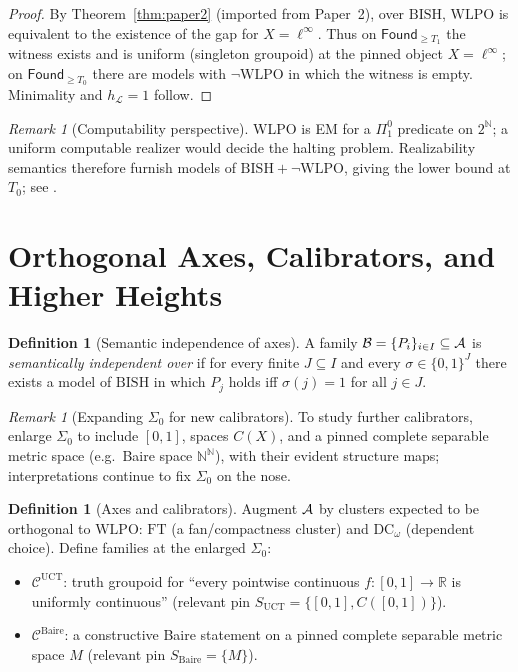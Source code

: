 \documentclass[11pt]{article}
\theoremstyle{definition}
\newtheorem{definition}[theorem]{Definition}
\theoremstyle{remark}
\newtheorem{remark}[theorem]{Remark}
\newcommand{\N}{\mathbb{N}}
\newcommand{\R}{\mathbb{R}}
\newcommand{\linf}{\ell^\infty}
\newcommand{\WLPO}{\mathrm{WLPO}}
\newcommand{\BISH}{\mathrm{BISH}}
\newcommand{\Found}{\mathsf{Found}}
\newcommand{\SigmaZero}{\Sigma_{0}}
\begin{document}
\begin{proof}
By Theorem~\ref{thm:paper2} (imported from Paper~2), over \(\BISH\),
\(\WLPO\) is equivalent to the existence of the gap for \(X=\linf\).
Thus on \(\Found_{\ge T_1}\) the witness exists and is uniform (singleton groupoid)
at the pinned object \(X=\linf\); on \(\Found_{\ge T_0}\) there are models with \(\neg\WLPO\) in which the witness is empty. Minimality and \(h_{\mathcal L}=1\) follow.
\end{proof}

\begin{remark}[Computability perspective]\label{p2:rem:computability}
WLPO is EM for a \(\Pi^0_1\) predicate on \(2^\N\); a uniform computable realizer would decide the halting problem. Realizability semantics therefore furnish models of \(\BISH+\neg\WLPO\), giving the lower bound at \(T_0\); see \cite{BridgesRichman,Ishihara06}.
\end{remark}

\section{Orthogonal Axes, Calibrators, and Higher Heights}\label{p2:sec:higher}

\begin{definition}[Semantic independence of axes]\label{p2:def:independence}
A family \(\mathcal{B}=\{P_i\}_{i\in I}\subseteq\mathcal{A}\) is \emph{semantically independent over \BISH} if for every finite \(J\subseteq I\) and every \(\sigma\in\{0,1\}^J\) there exists a model of \(\BISH\) in which \(P_j\) holds iff \(\sigma(j)=1\) for all \(j\in J\).
\end{definition}

\begin{remark}[Expanding \(\SigmaZero\) for new calibrators]\label{p2:rem:expand-sigma0}
To study further calibrators, enlarge \(\SigmaZero\) to include \([0,1]\),
spaces \(C(X)\), and a pinned complete separable metric space (e.g.\ Baire space \(\N^\N\)),
with their evident structure maps; interpretations continue to fix \(\SigmaZero\) on the nose.
\end{remark}

\begin{definition}[Axes and calibrators]\label{p2:def:axes-calibrators}
Augment \(\mathcal{A}\) by clusters expected to be orthogonal to \(\WLPO\):
\(\mathrm{FT}\) (a fan/compactness cluster) and \(\mathrm{DC}_\omega\) (dependent choice).
Define families at the enlarged \(\SigmaZero\):
\begin{itemize}
\item \(\mathcal C^{\mathrm{UCT}}\): truth groupoid for ``every pointwise continuous \(f:[0,1]\to\R\) is uniformly continuous'' (relevant pin \(S_{\mathrm{UCT}}=\{[0,1],C([0,1])\}\)).
\item \(\mathcal C^{\mathrm{Baire}}\): a constructive Baire statement on a pinned complete separable metric space \(M\) (relevant pin \(S_{\mathrm{Baire}}=\{M\}\)).
\end{itemize}
\end{definition}
\end{document}
